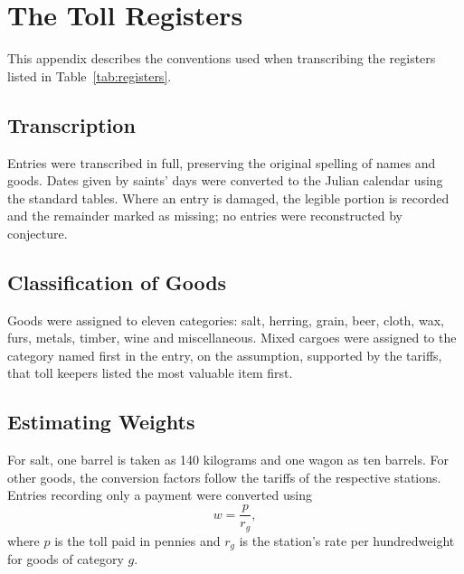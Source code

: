 \chapter{The Toll Registers}
\label{app:registers}

This appendix describes the conventions used when transcribing the registers listed in Table~\ref{tab:registers}.

\section{Transcription}

Entries were transcribed in full, preserving the original spelling of names and goods. Dates given by saints' days were converted to the Julian calendar using the standard tables. Where an entry is damaged, the legible portion is recorded and the remainder marked as missing; no entries were reconstructed by conjecture.

\section{Classification of Goods}

Goods were assigned to eleven categories: salt, herring, grain, beer, cloth, wax, furs, metals, timber, wine and miscellaneous. Mixed cargoes were assigned to the category named first in the entry, on the assumption, supported by the tariffs, that toll keepers listed the most valuable item first.

\section{Estimating Weights}

For salt, one barrel is taken as 140 kilograms and one wagon as ten barrels. For other goods, the conversion factors follow the tariffs of the respective stations. Entries recording only a payment were converted using
\begin{equation}
  w = \frac{p}{r_g},
\end{equation}
where $p$ is the toll paid in pennies and $r_g$ is the station's rate per hundredweight for goods of category $g$.
